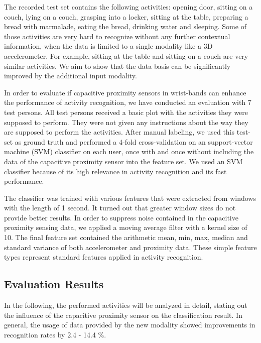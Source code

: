 \documentclass[runningheads,a4paper]{llncs}
\begin{document}
The recorded test set contains the following activities: opening door, sitting on a couch, lying on a couch, grasping into a locker, sitting at the table, preparing a bread with marmalade, eating the bread, drinking water and sleeping. Some of those activities are very hard to recognize without any further contextual information, when the data is limited to a single modality like a 3D accelerometer. For example, sitting at the table and sitting on a couch are very similar activities. We aim to show that the data basis can be significantly improved by the additional input modality. 

In order to evaluate if capacitive proximity sensors in wrist-bands can enhance the performance of activity recognition, we have conducted an evaluation with 7 test persons. All test persons received a basic plot with the activities they were supposed to perform. They were not given any instructions about the way they are supposed to perform the activities. After manual labeling, we used this test-set as ground truth and performed a 4-fold cross-validation on an support-vector machine (SVM) classifier on each user, once with and once without including the data of the capacitive proximity sensor into the feature set. We used an SVM classifier because of its high relevance in activity recognition and its fast performance. 

The classifier was trained with various features that were extracted from windows with the length of 1 second. It turned out that greater window sizes do not provide better results. In order to suppress noise contained in the capacitive proximity sensing data, we applied a moving average filter with a kernel size of 10. The final feature set contained the arithmetic mean, min, max, median and standard variance of both accelerometer and proximity data. These simple feature types represent standard features applied in activity recognition. 

\subsection{Evaluation Results}
\label{sect:evaluation}

In the following, the performed activities will be analyzed in detail, stating out the influence of the capacitive proximity sensor on the classification result. In general, the usage of data provided by the new modality showed improvements in recognition rates by 2.4 - 14.4 \%.
\end{document}
